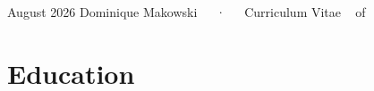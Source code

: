 \documentclass[11pt,a4paper,]{awesome-cv}
\begin{document}
\makecvheader

\makecvfooter
  {August 2026}
    {Dominique Makowski~~~·~~~Curriculum Vitae}
  {\thepage~ of \pageref{LastPage}~}





\normalsize

\section{Education}\label{education}
\end{document}
